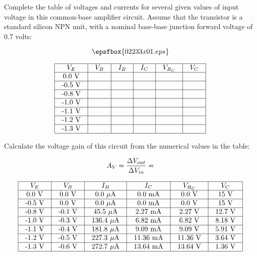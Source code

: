 

Complete the table of voltages and currents for several given values of input voltage in this common-base amplifier circuit.  Assume that the transistor is a standard silicon NPN unit, with a nominal base-base junction forward voltage of 0.7 volts:

$$\epsfbox{02233x01.eps}$$


$$\vbox{\offinterlineskip
\halign{\strut
\vrule \quad\hfil # \ \hfil & 
\vrule \quad\hfil # \ \hfil & 
\vrule \quad\hfil # \ \hfil & 
\vrule \quad\hfil # \ \hfil & 
\vrule \quad\hfil # \ \hfil & 
\vrule \quad\hfil # \ \hfil \vrule \cr
\noalign{\hrule}
%
$V_E$ & $V_B$ & $I_B$  & $I_C$ & $V_{R_C}$ & $V_C$ \cr
%
\noalign{\hrule}
%
0.0 V &  &  &  &  & \cr
%
\noalign{\hrule}
%
-0.5 V &  &  &  &  & \cr
%
\noalign{\hrule}
%
-0.8 V &  &  &  &  & \cr
%
\noalign{\hrule}
%
-1.0 V &  &  &  &  & \cr
%
\noalign{\hrule}
%
-1.1 V &  &  &  &  & \cr
%
\noalign{\hrule}
%
-1.2 V &  &  &  &  & \cr
%
\noalign{\hrule}
%
-1.3 V &  &  &  &  & \cr
%
\noalign{\hrule}
} %
}$$ %

Calculate the voltage gain of this circuit from the numerical values in the table:

$$A_V = {\Delta V_{out} \over \Delta V_{in}} = $$








$$\vbox{\offinterlineskip
\halign{\strut
\vrule \quad\hfil # \ \hfil & 
\vrule \quad\hfil # \ \hfil & 
\vrule \quad\hfil # \ \hfil & 
\vrule \quad\hfil # \ \hfil & 
\vrule \quad\hfil # \ \hfil & 
\vrule \quad\hfil # \ \hfil \vrule \cr
\noalign{\hrule}
%
$V_E$ & $V_B$ & $I_B$  & $I_C$ & $V_{R_C}$ & $V_C$ \cr
%
\noalign{\hrule}
%
0.0 V & 0.0 V & 0.0 $\mu$A & 0.0 mA & 0.0 V & 15 V \cr
%
\noalign{\hrule}
%
-0.5 V & 0.0 V & 0.0 $\mu$A & 0.0 mA & 0.0 V & 15 V \cr
%
\noalign{\hrule}
%
-0.8 V & -0.1 V & 45.5 $\mu$A & 2.27 mA & 2.27 V & 12.7 V \cr
%
\noalign{\hrule}
%
-1.0 V & -0.3 V & 136.4 $\mu$A & 6.82 mA & 6.82 V & 8.18 V \cr
%
\noalign{\hrule}
%
-1.1 V & -0.4 V & 181.8 $\mu$A & 9.09 mA & 9.09 V & 5.91 V \cr
%
\noalign{\hrule}
%
-1.2 V & -0.5 V & 227.3 $\mu$A & 11.36 mA & 11.36 V & 3.64 V \cr
%
\noalign{\hrule}
%
-1.3 V & -0.6 V & 272.7 $\mu$A & 13.64 mA & 13.64 V & 1.36 V \cr
%
\noalign{\hrule}
} %
}$$ %

